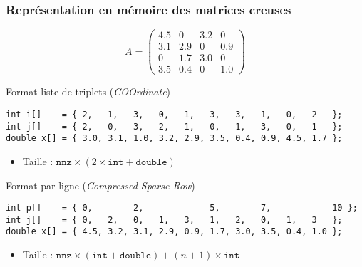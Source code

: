 \documentclass[xcolor={x11names,svgnames}]{beamer}
\begin{document}
\begin{frame}[fragile]
  \frametitle{Représentation en mémoire des matrices creuses}

  \[
    A = \begin{pmatrix}
      4.5 & 0 & 3.2 & 0 \\
      3.1 & 2.9 & 0 & 0.9 \\
      0 & 1.7 & 3.0 & 0 \\
      3.5 & 0.4 & 0 & 1.0
    \end{pmatrix}
  \]
  
  \begin{alertblock}{Format \og liste de triplets\fg{} (\emph{COOrdinate})}
\vspace{-2mm}
{\scriptsize
\begin{verbatim}
int i[]    = { 2,   1,   3,   0,   1,   3,   3,   1,   0,   2   };
int j[]    = { 2,   0,   3,   2,   1,   0,   1,   3,   0,   1   };
double x[] = { 3.0, 3.1, 1.0, 3.2, 2.9, 3.5, 0.4, 0.9, 4.5, 1.7 };
\end{verbatim}
}
\vspace{-4mm}
\begin{itemize}
    \item Taille : $\texttt{nnz} \times (2 \times \texttt{int} + \texttt{double})$
    \end{itemize}
  \end{alertblock}

  \begin{exampleblock}{Format \og par ligne\fg{} (\emph{Compressed Sparse Row})}
\vspace{-2mm}
{\scriptsize
\begin{verbatim}
int p[]    = { 0,        2,             5,        7,            10 };
int j[]    = { 0,   2,   0,   1,   3,   1,   2,   0,   1,   3   };
double x[] = { 4.5, 3.2, 3.1, 2.9, 0.9, 1.7, 3.0, 3.5, 0.4, 1.0 };
\end{verbatim}
}
\vspace{-4mm}
\begin{itemize}
    \item Taille : $\texttt{nnz} \times (\texttt{int} + \texttt{double}) + (n + 1) \times \texttt{int}$
    \end{itemize}
  \end{exampleblock}
\end{frame}

\end{document}
